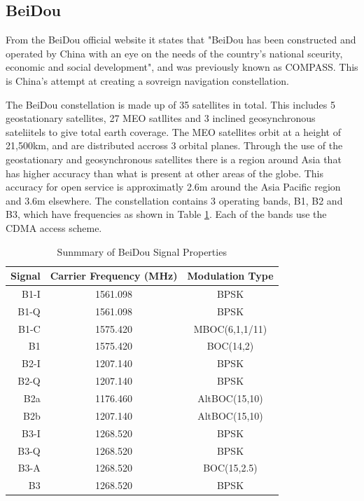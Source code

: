 \subsection{BeiDou} \label{subsec:GNSS_BeiDouIntro}
From the BeiDou official website it states that "BeiDou has been constructed and operated by China with an eye on the needs of the country's national sceurity, economic
and social development", and was previously known as COMPASS. This is China's attempt at creating a sovreign navigation constellation.

The BeiDou constellation is made up of 35 satellites in total. This includes 5 geostationary satellites, 27 MEO satllites and 3 inclined geosynchronous sateliitels to
give total earth coverage. The MEO satellites orbit at a height of 21,500km, and are distributed accross 3 orbital planes. Through the use of the geostationary and
geosynchronous satellites there is a region around Asia that has higher accuracy than what is present at other areas of the globe. This accuracy for open service is
approximatly 2.6m around the Asia Pacific region and 3.6m elsewhere. The constellation contains 3 operating bands, B1, B2 and B3, which have frequencies as shown in Table
\ref{tab:Beidou Signal}. Each of the bands use the CDMA access scheme.

\renewcommand{\arraystretch}{1.5}
\begin{table}
    \begin{center}
        \caption{Sunmmary of BeiDou Signal Properties}
        \label{tab:Beidou Signal}
        \begin{tabular}{ |r|c|c| }
            \hline
            \textbf{Signal} & \textbf{Carrier Frequency (MHz)} & \textbf{Modulation Type} \\
            \hline
            B1-I & 1561.098 & BPSK\\
            \hline
            B1-Q & 1561.098 & BPSK\\
            \hline
            B1-C & 1575.420 & MBOC(6,1,1/11)\\
            \hline
            B1 & 1575.420 & BOC(14,2)\\
            \hline 
            \hline
            B2-I & 1207.140 & BPSK\\
            \hline
            B2-Q & 1207.140 & BPSK\\
            \hline
            B2a & 1176.460 & AltBOC(15,10)\\
            \hline
            B2b & 1207.140 & AltBOC(15,10)\\
            \hline 
            \hline
            B3-I & 1268.520 & BPSK\\
            \hline
            B3-Q & 1268.520 & BPSK\\
            \hline
            B3-A & 1268.520 & BOC(15,2.5)\\
            \hline
            B3 & 1268.520 & BPSK\\
            \hline
        \end{tabular}
    \end{center}
\end{table}
\renewcommand{\arraystretch}{1}

